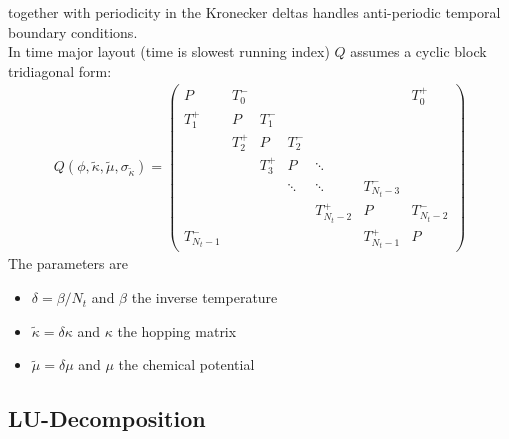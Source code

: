\documentclass[a4paper, fleqn, twoside, notitlepage]{scrartcl}
\begin{document}
together with periodicity in the Kronecker deltas handles anti-periodic temporal boundary conditions.\\
In time major layout (time is slowest running index) $Q$ assumes a cyclic block tridiagonal form:
\begin{align}
  Q(\phi, \tilde{\kappa}, \tilde{\mu}, \sigma_{\tilde{\kappa}}) =
  \begin{pmatrix}
    P         & T^-_0 &       &         &           &              & T^+_0    \\
    T^+_1     & P     & T^-_1 &         &           &              &          \\
              & T^+_2 & P     & T^-_2   &           &              &          \\
              &       & T^+_3 & P      & \ddots         &              &          \\
              &       &       & \ddots     & \ddots         & T^-_{N_t-3}    &          \\
              &       &       &        & T^+_{N_t-2} & P            & T^-_{N_t-2}\\
    T^-_{N_t-1} &       &       &        &           & T^+_{N_t-1}    & P
  \end{pmatrix}
\end{align}
The parameters are
\begin{itemize}
\item $\delta = \beta / N_t$ and $\beta$ the inverse temperature
\item $\tilde{\kappa} = \delta\kappa$ and $\kappa$ the hopping matrix
\item $\tilde{\mu} = \delta\mu$ and $\mu$ the chemical potential
\end{itemize}

\subsection{LU-Decomposition}\label{sec:lu_decomposition_v2}
\end{document}
